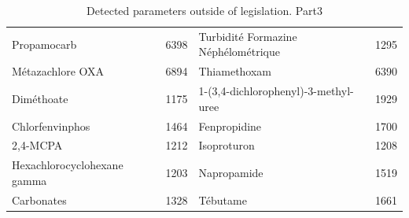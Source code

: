 \documentclass{article}
\begin{document}
\begin{table}[H]
{\begin{tabular}{|l|l||l|l|}
    Propamocarb & 6398 & Turbidité Formazine Néphélométrique & 1295 \\
    Métazachlore OXA & 6894 & Thiamethoxam & 6390 \\
    Diméthoate & 1175 & 1-(3,4-dichlorophenyl)-3-methyl-uree & 1929 \\
    Chlorfenvinphos & 1464 & Fenpropidine & 1700 \\
    2,4-MCPA & 1212 & Isoproturon & 1208 \\
    Hexachlorocyclohexane gamma & 1203 & Napropamide & 1519 \\
    Carbonates & 1328 & Tébutame & 1661 \\
    \hline
\end{tabular}
}
\caption{Detected parameters outside of legislation. Part3}
\end{table}
\end{document}
